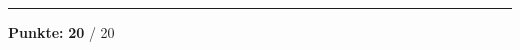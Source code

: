 \documentclass[11pt, a4paper]{article}
\newcommand{\maxpunkte}{20}
\newcommand{\loesung}[1]{\textcolor{loesung}{\textbf{#1}}}
\begin{document}

\vspace{20pt}
\hrule
\vspace{10pt}

\begin{flushright}
\textbf{Punkte:} \loesung{\maxpunkte} / \maxpunkte
\end{flushright}
\end{document}
